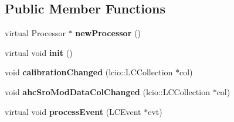 \subsection*{Public Member Functions}
\begin{DoxyCompactItemize}
\item 
virtual Processor $\ast$ {\bfseries new\-Processor} ()\label{classCALICE_1_1FastCalib2DProcessor_aba8e344351415f1bfdc0a0ab54173c27}

\item 
virtual void {\bfseries init} ()\label{classCALICE_1_1FastCalib2DProcessor_a6e39f004ac66605fac85eaf3c2303066}

\item 
void {\bfseries calibration\-Changed} (lcio\-::\-L\-C\-Collection $\ast$col)\label{classCALICE_1_1FastCalib2DProcessor_af9b944cab5d25801f3de9538ca58a5fb}

\item 
void {\bfseries ahc\-Sro\-Mod\-Data\-Col\-Changed} (lcio\-::\-L\-C\-Collection $\ast$col)\label{classCALICE_1_1FastCalib2DProcessor_ab5ffcf2162e4d6c1356e19637e407c2c}

\item 
virtual void {\bfseries process\-Event} (L\-C\-Event $\ast$evt)\label{classCALICE_1_1FastCalib2DProcessor_a9c91ffa8449e011e0f99d9e2334050ee}

\end{DoxyCompactItemize}
